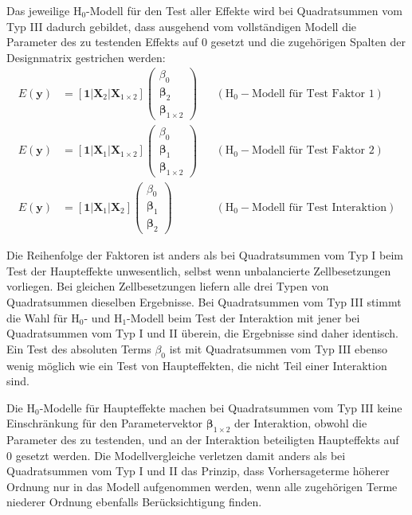 Das jeweilige $\text{H}_{0}$-Modell für den Test aller Effekte wird bei Quadratsummen vom Typ III dadurch gebildet, dass ausgehend vom vollständigen Modell die Parameter des zu testenden Effekts auf $0$ gesetzt und die zugehörigen Spalten der Designmatrix gestrichen werden:
\begin{align*}
E(\bm{y}) &= [\bm{1} | \bm{X}_{2} | \bm{X}_{1 \times 2}] \left(\begin{array}{l} \beta_{0} \\ \bm{\beta}_{2} \\ \bm{\beta}_{1 \times 2}\end{array}\right) && (\text{H}_{0}-\text{Modell für Test Faktor 1}) \\
E(\bm{y}) &= [\bm{1} | \bm{X}_{1} | \bm{X}_{1 \times 2}] \left(\begin{array}{l} \beta_{0} \\ \bm{\beta}_{1} \\ \bm{\beta}_{1 \times 2}\end{array}\right) && (\text{H}_{0}-\text{Modell für Test Faktor 2}) \\
E(\bm{y}) &= [\bm{1} | \bm{X}_{1} | \bm{X}_{2}] \left(\begin{array}{l} \beta_{0} \\ \bm{\beta}_{1} \\ \bm{\beta}_{2}\end{array}\right) && (\text{H}_{0}-\text{Modell für Test Interaktion})
\end{align*}

Die Reihenfolge der Faktoren ist anders als bei Quadratsummen vom Typ I beim Test der Haupteffekte unwesentlich, selbst wenn unbalancierte Zellbesetzungen vorliegen. Bei gleichen Zellbesetzungen liefern alle drei Typen von Quadratsummen dieselben Ergebnisse. Bei Quadratsummen vom Typ III stimmt die Wahl für $\text{H}_{0}$- und $\text{H}_{1}$-Modell beim Test der Interaktion mit jener bei Quadratsummen vom Typ I und II überein, die Ergebnisse sind daher identisch. Ein Test des absoluten Terms $\beta_{0}$ ist mit Quadratsummen vom Typ III ebenso wenig möglich wie ein Test von Haupteffekten, die nicht Teil einer Interaktion sind.

Die $\text{H}_{0}$-Modelle für Haupteffekte machen bei Quadratsummen vom Typ III keine Einschränkung für den Parametervektor $\bm{\beta}_{1 \times 2}$ der Interaktion, obwohl die Parameter des zu testenden, und an der Interaktion beteiligten Haupteffekts auf $0$ gesetzt werden. Die Modellvergleiche verletzen damit anders als bei Quadratsummen vom Typ I und II das Prinzip, dass Vorhersageterme höherer Ordnung nur in das Modell aufgenommen werden, wenn alle zugehörigen Terme niederer Ordnung ebenfalls Berücksichtigung finden.

